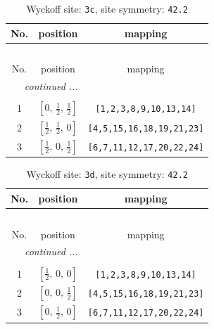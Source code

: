 \documentclass[fleqn,8pt]{jsarticle}
\begin{document}
\begin{longtable}{ccc}
\caption{Wyckoff site: {\tt 3c}, site symmetry: {\tt 42.2}}
 \\
 \hline \hline
No. & position & mapping \\ \hline \endfirsthead

\multicolumn{2}{l}{\tablename\ \thetable{}} \\
 \hline \hline
No. & position & mapping \\ \hline \endhead

 \hline \hline
\multicolumn{2}{r}{\footnotesize\it continued ...} \\ \endfoot

 \hline \hline
\multicolumn{2}{r}{} \\ \endlastfoot

1 & $\left[ 0,\, \frac{1}{2},\, \frac{1}{2} \right]$ & {\tt [1,2,3,8,9,10,13,14]} \\ \hline
2 & $\left[ \frac{1}{2},\, \frac{1}{2},\, 0 \right]$ & {\tt [4,5,15,16,18,19,21,23]} \\ \hline
3 & $\left[ \frac{1}{2},\, 0,\, \frac{1}{2} \right]$ & {\tt [6,7,11,12,17,20,22,24]} \\
\end{longtable}
\renewcommand{\arraystretch}{1.2}
\begin{longtable}{ccc}
\caption{Wyckoff site: {\tt 3d}, site symmetry: {\tt 42.2}}
 \\
 \hline \hline
No. & position & mapping \\ \hline \endfirsthead

\multicolumn{2}{l}{\tablename\ \thetable{}} \\
 \hline \hline
No. & position & mapping \\ \hline \endhead

 \hline \hline
\multicolumn{2}{r}{\footnotesize\it continued ...} \\ \endfoot

 \hline \hline
\multicolumn{2}{r}{} \\ \endlastfoot

1 & $\left[ \frac{1}{2},\, 0,\, 0 \right]$ & {\tt [1,2,3,8,9,10,13,14]} \\ \hline
2 & $\left[ 0,\, 0,\, \frac{1}{2} \right]$ & {\tt [4,5,15,16,18,19,21,23]} \\ \hline
3 & $\left[ 0,\, \frac{1}{2},\, 0 \right]$ & {\tt [6,7,11,12,17,20,22,24]} \\
\end{longtable}
\renewcommand{\arraystretch}{1.2}
\end{document}

